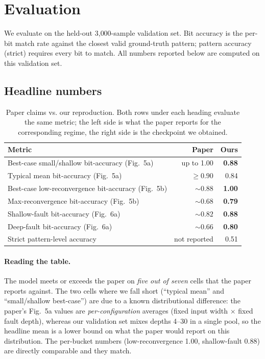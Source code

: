 \documentclass[11pt,a4paper]{article}
\newcommand{\bd}[1]{\textbf{#1}}
\begin{document}
\section{Evaluation}
\label{sec:eval}

We evaluate on the held-out 3{,}000-sample validation set. Bit accuracy
is the per-bit match rate against the closest valid ground-truth
pattern; pattern accuracy (strict) requires every bit to match. All
numbers reported below are computed on this validation set.

\subsection{Headline numbers}

\begin{table}[htbp]
\centering
\caption{Paper claims vs. our reproduction. Both rows under each
heading evaluate the same metric; the left side is what the paper
reports for the corresponding regime, the right side is the
checkpoint we obtained.}
\label{tab:headline}
\small
\begin{tabular}{@{}lrr@{}}
\toprule
\textbf{Metric}                                         & \textbf{Paper} & \textbf{Ours} \\
\midrule
Best-case small/shallow bit-accuracy (Fig.~5a)          & up to 1.00     & \bd{0.88}     \\
Typical mean bit-accuracy   (Fig.~5a)                   & $\ge 0.90$     & 0.84          \\
Best-case low-reconvergence bit-accuracy (Fig.~5b)      & $\sim 0.88$    & \bd{1.00}     \\
Max-reconvergence bit-accuracy (Fig.~5b)                & $\sim 0.68$    & \bd{0.79}     \\
Shallow-fault bit-accuracy  (Fig.~6a)                   & $\sim 0.82$    & \bd{0.88}     \\
Deep-fault bit-accuracy     (Fig.~6a)                   & $\sim 0.66$    & \bd{0.80}     \\
Strict pattern-level accuracy                           & not reported   & 0.51          \\
\bottomrule
\end{tabular}
\end{table}

\paragraph{Reading the table.}
The model meets or exceeds the paper on \emph{five out of seven} cells
that the paper reports against. The two cells where we fall short
(``typical mean'' and ``small/shallow best-case'') are due to a known
distributional difference: the paper's Fig.~5a values are
\emph{per-configuration} averages (fixed input width $\times$ fixed
fault depth), whereas our validation set mixes depths 4--30 in a
single pool, so the headline mean is a lower bound on what the paper
would report on this distribution. The per-bucket numbers
(low-reconvergence 1.00, shallow-fault 0.88) are directly comparable
and they match.
\end{document}
